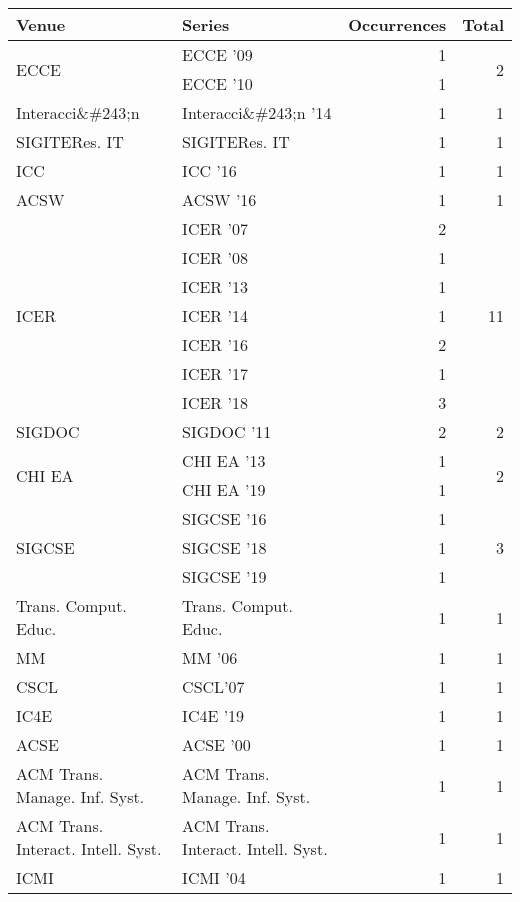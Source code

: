 \begin{table*}[t]
\begin{tabular}{llrr}
Venue & Series & Occurrences & Total\\\hline
\multirow{2}{*}{ECCE } & ECCE '09 & 1 & \multirow{2}{*}{2}\\
& ECCE '10 & 1 &\\
\multirow{1}{*}{Interacci\&\#243;n } & Interacci\&\#243;n '14 & 1 & \multirow{1}{*}{1}\\
\multirow{1}{*}{SIGITERes. IT} & SIGITERes. IT & 1 & \multirow{1}{*}{1}\\
\multirow{1}{*}{ICC } & ICC '16 & 1 & \multirow{1}{*}{1}\\
\multirow{1}{*}{ACSW } & ACSW '16 & 1 & \multirow{1}{*}{1}\\
\multirow{7}{*}{ICER } & ICER '07 & 2 & \multirow{7}{*}{11}\\
& ICER '08 & 1 &\\
& ICER '13 & 1 &\\
& ICER '14 & 1 &\\
& ICER '16 & 2 &\\
& ICER '17 & 1 &\\
& ICER '18 & 3 &\\
\multirow{1}{*}{SIGDOC } & SIGDOC '11 & 2 & \multirow{1}{*}{2}\\
\multirow{2}{*}{CHI EA } & CHI EA '13 & 1 & \multirow{2}{*}{2}\\
& CHI EA '19 & 1 &\\
\multirow{3}{*}{SIGCSE } & SIGCSE '16 & 1 & \multirow{3}{*}{3}\\
& SIGCSE '18 & 1 &\\
& SIGCSE '19 & 1 &\\
\multirow{1}{*}{Trans. Comput. Educ.} & Trans. Comput. Educ. & 1 & \multirow{1}{*}{1}\\
\multirow{1}{*}{MM } & MM '06 & 1 & \multirow{1}{*}{1}\\
\multirow{1}{*}{CSCL} & CSCL'07 & 1 & \multirow{1}{*}{1}\\
\multirow{1}{*}{IC4E } & IC4E '19 & 1 & \multirow{1}{*}{1}\\
\multirow{1}{*}{ACSE } & ACSE '00 & 1 & \multirow{1}{*}{1}\\
\multirow{1}{*}{ACM Trans. Manage. Inf. Syst.} & ACM Trans. Manage. Inf. Syst. & 1 & \multirow{1}{*}{1}\\
\multirow{1}{*}{ACM Trans. Interact. Intell. Syst.} & ACM Trans. Interact. Intell. Syst. & 1 & \multirow{1}{*}{1}\\
\multirow{1}{*}{ICMI } & ICMI '04 & 1 & \multirow{1}{*}{1}\\

\end{tabular}
\end{table*}
